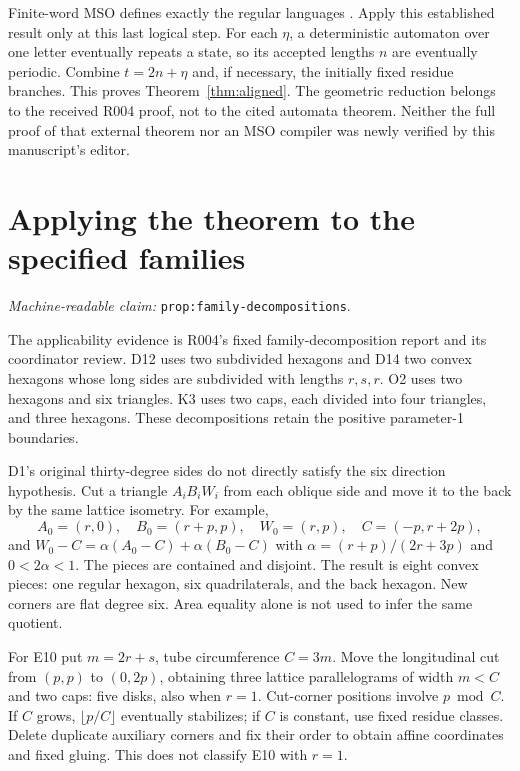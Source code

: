 \documentclass[11pt]{amsart}
\newcommand{\record}[1]{\nolinkurl{#1}}
\newcommand{\claimid}[1]{\par\nopagebreak\noindent\textit{Machine-readable claim:} \record{#1}.\par}
\theoremstyle{definition}\newtheorem{definition}{Definition}
\begin{document}
Finite-word MSO defines exactly the regular languages
\cite[Section 3.1, Theorem 3.2]{MSO}. Apply this established result
only at this last logical step. For each $\eta$, a deterministic
automaton over one letter eventually repeats a state, so its accepted
lengths $n$ are eventually periodic. Combine $t=2n+\eta$ and, if
necessary, the initially fixed residue branches. This proves
Theorem~\ref{thm:aligned}. The geometric reduction belongs to the
received R004 proof, not to the cited automata theorem. Neither the
full proof of that external theorem nor an MSO compiler was newly
verified by this manuscript's editor.

\section{Applying the theorem to the specified families}\label{sec:families}
\label{prop:family-decompositions}\claimid{prop:family-decompositions}
The applicability evidence is R004's fixed family-decomposition report
and its coordinator review. D12 uses two subdivided hexagons and D14
two convex hexagons whose long sides are subdivided with lengths
$r,s,r$. O2 uses two hexagons and six triangles. K3 uses two caps,
each divided into four triangles, and three hexagons. These
decompositions retain the positive parameter-1 boundaries.

D1's original thirty-degree sides do not directly satisfy the six
direction hypothesis. Cut a triangle $A_iB_iW_i$ from each oblique side
and move it to the back by the same lattice isometry. For example,
\[
 A_0=(r,0),\quad B_0=(r+p,p),\quad W_0=(r,p),\quad C=(-p,r+2p),
\]
and $W_0-C=\alpha(A_0-C)+\alpha(B_0-C)$ with
$\alpha=(r+p)/(2r+3p)$ and $0<2\alpha<1$. The pieces are contained
and disjoint. The result is eight convex pieces: one regular hexagon,
six quadrilaterals, and the back hexagon. New corners are flat degree
six. Area equality alone is not used to infer the same quotient.

For E10 put $m=2r+s$, tube circumference $C=3m$. Move the longitudinal
cut from $(p,p)$ to $(0,2p)$, obtaining three lattice parallelograms
of width $m<C$ and two caps: five disks, also when $r=1$. Cut-corner
positions involve $p\bmod C$. If $C$ grows, $\lfloor p/C\rfloor$
eventually stabilizes; if $C$ is constant, use fixed residue classes.
Delete duplicate auxiliary corners and fix their order to obtain
affine coordinates and fixed gluing. This does not classify E10 with
$r=1$.
\end{document}

